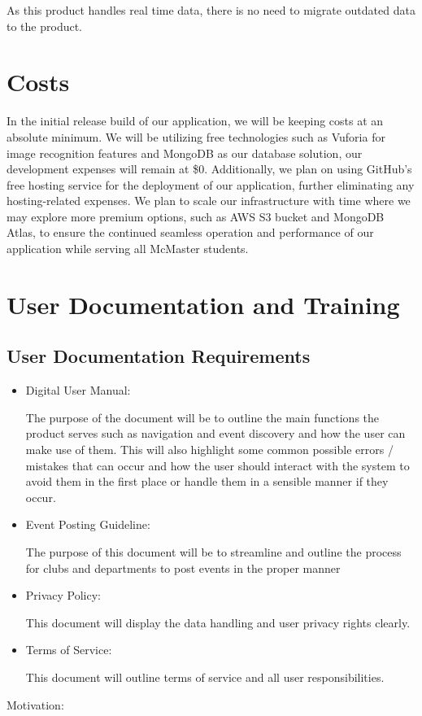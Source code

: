 \documentclass[12pt]{article}
\begin{document}
As this product handles real time data, there is no need to migrate outdated data to the product.

\section{Costs}

In the initial release build of our application, we will be keeping costs at an absolute minimum. We will be utilizing free technologies such as Vuforia for image recognition features and MongoDB as our database solution, our development expenses will remain at \$0. Additionally, we plan on using GitHub's free hosting service for the deployment of our application, further eliminating any hosting-related expenses. We plan to scale our infrastructure with time where we may explore more premium options, such as AWS S3 bucket and MongoDB Atlas, to ensure the continued seamless operation and performance of our application while serving all McMaster students.

\section{User Documentation and Training}
\subsection{User Documentation Requirements}

\begin{itemize}

\item Digital User Manual:

The purpose of the document will be to outline the main functions the product serves such as navigation and event discovery and how the user can make use of them. This will also highlight some common possible errors / mistakes that can occur and how the user should interact with the system to avoid them in the first place or handle them in a sensible manner if they occur.

 

\item Event Posting Guideline:

The purpose of this document will be to streamline and outline the process for clubs and departments to post events in the proper manner

\item Privacy Policy:

This document will display the data handling and user privacy rights clearly.

 

\item Terms of Service:

This document will outline terms of service and all user responsibilities.

\end{itemize}
Motivation:
\end{document}
